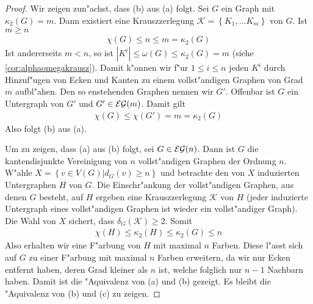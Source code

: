 \begin{proof}
  Wir zeigen zun"achst, dass (b) aus (a) folgt. Sei $G$ ein Graph mit $\kappa_{2}(G) =m$. Dann existiert eine Krauszzerlegung $\mathcal{K} = \left\{ K_1,\dots K_m \right\}$ von $G$. Ist $m \geq n$
  \begin{align*}
    \chi(G) \leq n \leq m = \kappa_2 (G)
  \end{align*}
  Ist andererseits $m< n $, so ist $|K^{i}| \leq \omega (G)  \leq \kappa_2 (G) =  m$ (siehe \ref{cor:alphaomegakrausz}). Damit k"onnen wir f"ur $1\leq i \leq n$ jeden $K^{i}$ durch Hinzuf"ugen von Ecken und Kanten zu einem vollst"andigen Graphen von Grad $m$ aufbl"ahen. Den so enstehenden Graphen nennen wir $G'$. Offenbar ist $G$ ein Untergraph von $G'$ und $G'\in {\cal EG}(m)$. Damit gilt 
  \begin{align*}
    \chi(G) \leq \chi (G') = m = \kappa_{2}(G)
  \end{align*}
  Also folgt (b) aus (a).  

  Um zu zeigen, dass (a) aus (b) folgt, sei $G\in {\cal EG}(n)$. Dann ist $G$ die kantendisjunkte Vereinigung von $n$ vollst"andigen Graphen der Ordnung $n$. W"ahle $X= \left\{ v\in V(G) | d_G(v) \geq n \right\}$ und betrachte den von $X$ induzierten Untergraphen $H$ von $G$. Die Einschr"ankung der vollst"andigen Graphen, aus denen $G$ besteht, auf $H$ ergeben eine Krauszzerlegung $\mathcal{K}$ von $H$ (jeder induzierte Untergraph eines vollst"andigen Graphen ist wieder ein vollst"andiger
  Graph). Die Wahl von $X$ sichert, dass $\delta_G(\mathcal K) \geq 2$. Somit 
  \begin{align*}
    \chi(H) \leq \kappa_{2}(H) \leq \kappa_{2}(G) \leq n
  \end{align*}
  Also erhalten wir eine F"arbung von $H$ mit maximal $n$ Farben. Diese l"asst sich auf $G$ zu einer F"arbung mit maximal $n$ Farben erweitern, da wir nur Ecken entfernt haben, deren Grad kleiner als $n$ ist, welche folglich nur $n-1$ Nachbarn haben. 
  Damit ist die "Aquivalenz von (a) und (b) gezeigt. Es bleibt die "Aquivalenz von (b) und (c) zu zeigen. 


\end{proof}
